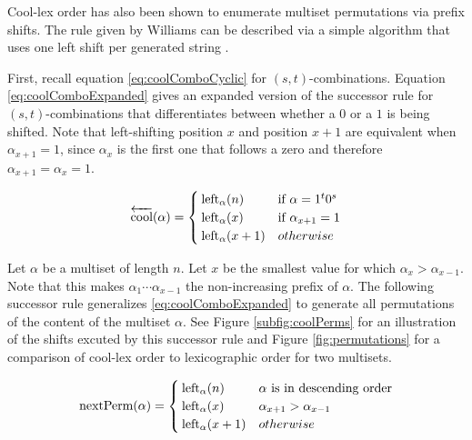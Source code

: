 Cool-lex order has also been shown to enumerate multiset permutations via prefix shifts.  The rule given by Williams can be described via a simple algorithm that uses one left shift per generated string  \cite{williams2009loopless}.

First, recall equation \ref{eq:coolComboCyclic} for $(s,t)$-combinations.  Equation \ref{eq:coolComboExpanded} gives an expanded version of the successor rule for $(s,t)$-combinations that differentiates between whether a $0$ or a $1$ is being shifted. Note that left-shifting position $x$ and position $x+1$ are equivalent when $\alpha_{x+1}=1$, since $\alpha_{x}$ is the first one that follows a zero and therefore $\alpha_{x+1}=\alpha_{x}=1$.

\begin{equation} \label{eq:coolComboExpanded}
    \overleftarrow{\text{cool}}(\alpha) = \begin{cases}
	\leftshift[\alpha]{n} & \text{if $\alpha=1^t0^s$}\\
	\leftshift[\alpha]{x} & \text{if $\alpha_{x+1}=1$}\\
	\leftshift[\alpha]{x+1} & otherwise\\
\end{cases}
\end{equation}


 Let $\alpha$ be a multiset of length $n$.
 Let $x$ be the smallest value for which $\alpha_{x} > \alpha_{x-1}$.  Note that this makes $\alpha_{1}\cdots\alpha_{x-1}$ the non-increasing prefix of $\alpha$.  The following successor rule generalizes \ref{eq:coolComboExpanded} to generate all permutations of the content of the multiset $\alpha$.  See Figure \ref{subfig:coolPerms} for an illustration of the shifts excuted by this successor rule and Figure \ref{fig:permutations} for a comparison of cool-lex order to lexicographic order for two multisets.

\begin{equation}\label{eq:coolPerms}
    \text{nextPerm}(\alpha) = \begin{cases}
	\leftshift[\alpha]{n} & \text{$\alpha$ is in descending order}\\
	\leftshift[\alpha]{x} & \alpha_{x+1} > \alpha_{x-1}\\
	\leftshift[\alpha]{x+1} & otherwise\\
\end{cases}
\end{equation}

